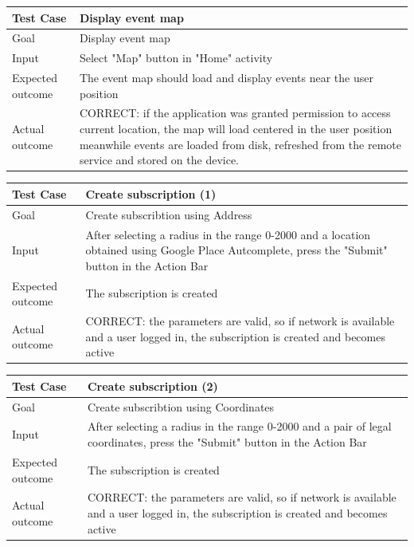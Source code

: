 \documentclass[a4paper]{scrreprt}
\begin{document}
\bigskip
\noindent
\begin{tabularx}{\linewidth}{|l|X|}
	\hline
	\textbf{Test Case} 	& \textbf{Display event map} \\ \hline
	Goal 				& Display event map \\ \hline
	Input 				& Select "Map" button in "Home" activity \\ \hline
	Expected outcome 	& The event map should load and display events near the user position \\ \hline
	Actual outcome 		& CORRECT: if the application was granted permission to access current location, the map will load centered in the user position meanwhile events are loaded from disk, refreshed from the remote service and stored on the device. \\ \hline
\end{tabularx}
\bigskip
\noindent
\begin{tabularx}{\linewidth}{|l|X|}
	\hline
	\textbf{Test Case} 	& \textbf{Create subscription (1)} \\ \hline
	Goal 				& Create subscribtion using Address\\ \hline
	Input 				& After selecting a radius in the range 0-2000 and a location obtained using Google Place Autcomplete, press the "Submit" button in the Action Bar \\ \hline
	Expected outcome 	& The subscription is created \\ \hline
	Actual outcome 		& CORRECT: the parameters are valid, so if network is available and a user logged in, the subscription is created and becomes active \\ \hline
\end{tabularx}
\bigskip
\noindent
\begin{tabularx}{\linewidth}{|l|X|}
	\hline
	\textbf{Test Case} 	& \textbf{Create subscription (2)} \\ \hline
	Goal 				& Create subscribtion using Coordinates\\ \hline
	Input 				& After selecting a radius in the range 0-2000 and a pair of legal coordinates, press the "Submit" button in the Action Bar \\ \hline
	Expected outcome 	& The subscription is created \\ \hline
	Actual outcome 		& CORRECT: the parameters are valid, so if network is available and a user logged in, the subscription is created and becomes active \\ \hline
\end{tabularx}
\bigskip
\noindent
\end{document}
